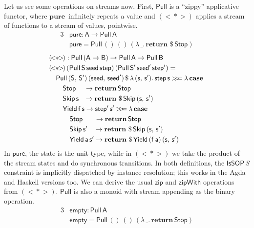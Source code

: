 \documentclass[acmsmall,screen,review,anonymous]{acmart}
\newcommand{\mit}[1]{{\mathsf{#1}}}
\newcommand{\msf}[1]{{\mathsf{#1}}}
\newcommand{\mbf}[1]{{\mathbf{#1}}}
\newcommand{\ind}{\hspace{1em}}
\newcommand{\return}{\mbf{return}\,}
\newcommand{\pure}{\mbf{pure}\,}
\newcommand{\lam}{\lambda\,}
\newcommand{\vA}{\mathsf{A}}
\newcommand{\vB}{\mathsf{B}}
\newcommand{\vS}{\mathsf{S}}
\newcommand{\va}{\mathsf{a}}
\newcommand{\vf}{\mathsf{f}}
\newcommand{\vs}{\mathsf{s}}
\newcommand{\IsSOP}{\msf{IsSOP}}
\newcommand{\case}{\mbf{case\,}}
\newcommand{\bind}{\mathbin{>\!\!>\mkern-6.7mu=}}
\theoremstyle{remark}
\newcommand{\ap}{{<\!\!*\!\!>}}
\newcommand{\Stop}{\msf{Stop}}
\newcommand{\Skip}{\msf{Skip}}
\newcommand{\Yield}{\msf{Yield}}
\newcommand{\dlr}{\,\$\,}
\newcommand{\seed}{\mit{seed}}
\newcommand{\step}{\mit{step}}
\newcommand{\Pull}{\msf{Pull}}
\begin{document}
Let us see some operations on streams now. First, $\Pull$ is a ``zippy''
applicative functor, where $\pure$ infinitely repeats a value and $(\!\ap\!)$
applies a stream of functions to a stream of values, pointwise.
\begin{alignat*}{3}
  &\mit{pure} : \vA \to \Pull\,\vA\\
  &\mit{pure} = \Pull\,()\,()\,(\lam \_.\,\return \dlr \Stop)
\end{alignat*}
\begin{alignat*}{3}
  &(\!\ap\!) : \Pull\,(\vA \to \vB) \to \Pull\,\vA \to \Pull\,\vB \\
  &(\!\ap\!)\,(\Pull\,\vS\,\seed\,\step)\,(\Pull\,\vS'\,\seed'\,\step') =\\
  & \ind \Pull\,(\vS,\,\vS')\,(\seed,\,\seed') \dlr \lam (\vs,\,\vs').\,\step\,\vs \bind \lam \case \\
  & \ind \ind \Stop \hspace{1.20em}        \to \return \Stop \\
  & \ind \ind \Skip\,\vs \hspace{0.75em}     \to \return \dlr \Skip\,(\vs,\,\vs') \\
  & \ind \ind \Yield\,\vf\,\vs \to \step'\,\vs' \bind \lam \case \\
  & \ind \ind \ind \Stop \hspace{1.7em} \to \return \Stop \\
  & \ind \ind \ind \Skip\,\vs'\hspace{0.9em}\to \return \dlr \Skip\,(\vs,\,\vs') \\
  & \ind \ind \ind \Yield\,\va\,\vs' \to \return \dlr \Yield\,(\vf\,\va)\,(\vs,\,\vs')
\end{alignat*}
In $\mit{pure}$, the state is the unit type, while in $(\!\ap\!)$ we take the
product of the stream states and do synchronous transitions. In both
definitions, the $\IsSOP\,S$ constraint is implicitly dispatched by instance
resolution; this works in the Agda and Haskell versions too. We can derive the
usual $\mit{zip}$ and $\mit{zipWith}$ operations from $(\!\ap\!)$. $\Pull$
is also a monoid with stream appending as the binary operation.
\begin{alignat*}{3}
  & \mit{empty} : \Pull\,\vA\\
  & \mit{empty} = \Pull\,()\,()\,(\lam \_.\,\return \Stop)
\end{alignat*}
\end{document}
